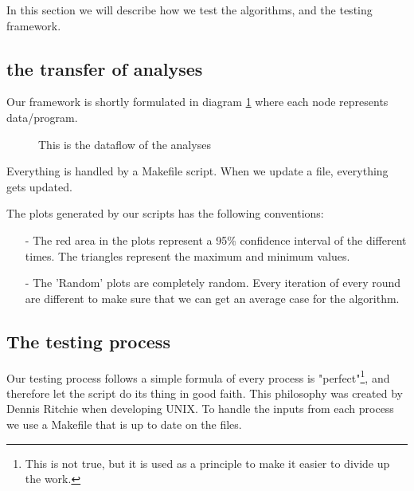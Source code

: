 
In this section we will describe how we test the algorithms, and the testing framework.
\subsection{the transfer of analyses}

Our framework is shortly formulated in diagram \ref{fig:flowdiagram} where each node represents data/program.

\begin{figure}[t]
\center
\label{fig:flowdiagram}
\caption{This is the dataflow of the analyses}
\end{figure}

Everything is handled by a Makefile script\cite{olsen_files_nodate}. When we update a file, everything gets updated.

The plots generated by our scripts has the following conventions:
\begin{itemize}
	\item[-] The red area in the plots represent a 95\% confidence interval of the different times. The triangles represent the maximum and minimum values.
	\item[-] The 'Random' plots are completely random. Every iteration of every round are different to make sure that we can get an average case for the algorithm. 
\end{itemize}

\subsection{The testing process}

Our testing process follows a simple formula of every process is "perfect"\footnote{This is not true, but it is used as a principle to make it easier to divide up the work.}, and therefore let the script do its thing in good faith. This philosophy was created by Dennis Ritchie when developing UNIX\cite{ritchie_stream_1984}. To handle the inputs from each process we use a Makefile that is up to date on the files. 

